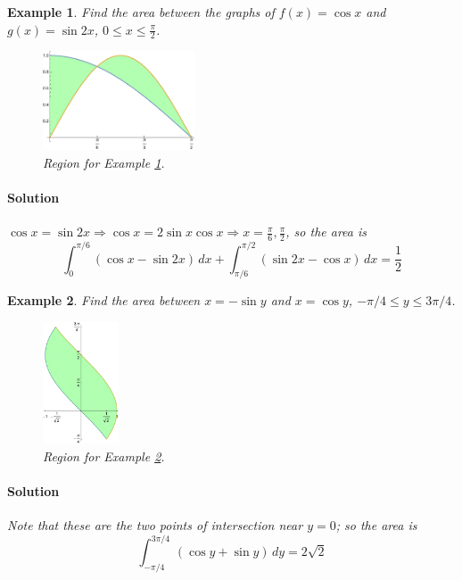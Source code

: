 \documentclass[letterpaper, 11pt, openany]{book}
\theoremstyle{mytheoremstyle}
\theoremstyle{myexamplestyle}
\newtheorem{example}{Example}[section]
\newenvironment{solution}{\paragraph{\sffamily \smaller \fontseries{b}\selectfont Solution}}{\hfill\faSquare}
\begin{document}
\begin{example}
    \label{e:areatrig2xident} Find the area between the graphs of $f(x) = \cos x$ and $g(x) = \sin 2x$, $0 \leq x \leq \frac{\pi}{2}$.
    \begin{figure}[htbp]
        \centering
            \includegraphics[width=0.4\textwidth]{Figures/areatrig2xident.pdf}
        \caption{Region for Example \ref{e:areatrig2xident}.}
        \label{f:areatrig2xident}
    \end{figure}
    
    \begin{solution}
        $\cos x = \sin 2x \Rightarrow \cos x = 2\sin x \cos x \Rightarrow x = \frac{\pi}{6}, \frac{\pi}{2}$, so the area is
        \[\int_{0}^{\pi /6} \left( \cos x - \sin 2x \right)\, dx + \int_{\pi/6}^{\pi/2} \left( \sin 2x - \cos x \right)\, dx = \frac{1}{2}\]
    \end{solution}
\end{example}

\begin{example}
    \label{e:areawrty} Find the area between $x = -\sin y$ and $x = \cos y$, $-\pi /4 \leq y \leq 3\pi/4$.
    \begin{figure}[htbp]
        \centering
            \includegraphics[width=0.2\textwidth]{Figures/areawrty.pdf}
        \caption{Region for Example \ref{e:areawrty}.}
        \label{f:areawrty}
    \end{figure}
    
    \begin{solution}
        Note that these are the two points of intersection near $y=0$; so the area is
        \[\int_{-\pi/4}^{3\pi/4} \left( \cos y + \sin y \right)\, dy = 2\sqrt{2}\] 
    \end{solution}  
\end{example}
\end{document}
